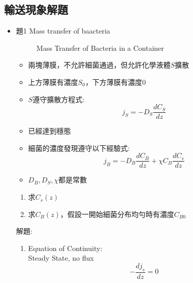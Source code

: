 \documentclass[../main.tex]{subfiles}
\begin{document}
\subsection{輸送現象解題}
\begin{itemize}
  \item 題1 Mass transfer of baacteria
  \begin{figure}[H]
    \centering
    \caption{Mass Transfer of Bacteria in a Container}
    \label{fig:mass_transfer_bacteria}
  \end{figure}
  \begin{itemize}
    \item 兩塊薄膜，不允許細菌通過，但允許化學液體$S$擴散
    \item 上方薄膜有濃度$S_0$，下方薄膜有濃度$0$
    \item $S$遵守擴散方程式:
      \begin{equation}
        j_S = -D_S \frac{dC_S}{dz}
      \end{equation}
    \item 已經達到穩態
    \item 細菌的濃度發現遵守以下經驗式:
      \begin{equation}
        j_B = -D_B \frac{dC_B}{dz} + \chi C_B \frac{dC_s}{dz}
      \end{equation}
    \item $D_B,D_S,\chi$都是常數
  \end{itemize}
  \begin{enumerate}
    \item 求$C_s(z)$
    \item 求$C_B(z)$，假設一開始細菌分布均勻時有濃度$C_{B0}$
  \end{enumerate}
  解題:
  \begin{enumerate}
    \item Equation of Continuity:\\
    Steady State, no flux
    \begin{equation}
      -\frac{dj_s}{dz} = 0
    \end{equation}

\end{enumerate}
\end{itemize}
\end{document}
